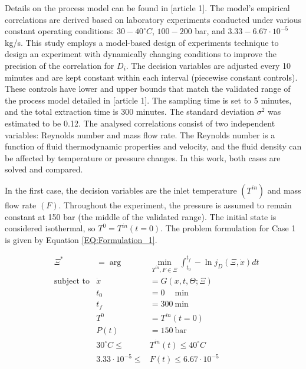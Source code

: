 \documentclass[../Article_Design_of_Experiment.tex]{subfiles}
\begin{document}
	Details on the process model can be found in [article 1]. The model's empirical correlations are derived based on laboratory experiments conducted under various constant operating conditions: $30 - 40^\circ C$, $100 - 200$ bar, and $3.33-6.67 \cdot 10^{-5}$ kg/s. This study employs a model-based design of experiments technique to design an experiment with dynamically changing conditions to improve the precision of the correlation for $D_i$. The decision variables are adjusted every 10 minutes and are kept constant within each interval (piecewise constant controls). These controls have lower and upper bounds that match the validated range of the process model detailed in [article 1]. The sampling time is set to 5 minutes, and the total extraction time is 300 minutes. The standard deviation $\sigma^2$ was estimated to be 0.12. The analysed correlations consist of two independent variables: Reynolds number and mass flow rate. The Reynolds number is a function of fluid thermodynamic properties and velocity, and the fluid density can be affected by temperature or pressure changes. In this work, both cases are solved and compared.
	
	In the first case, the decision variables are the inlet temperature $(T^{in})$ and mass flow rate $(F)$. Throughout the experiment, the pressure is assumed to remain constant at 150 bar (the middle of the validated range). The initial state is considered isothermal, so $T^0 = T^{in}(t=0)$. The problem formulation for Case 1 is given by Equation \ref{EQ:Formulation_1}.
	
	{\footnotesize
	\begin{equation}
		\begin{aligned} 
			&\Xi^* &= \arg &\min_{ T^{in}, F \in \Xi} \int_{t_0}^{t_f} - \ln j_D(\Xi,\dot{x}) dt  \\
			&\text{subject to}
			& \dot{x} &= G(x,t,\Theta;\Xi) \\
			&& t_0&=0\quad~\text{min} \\
			&& t_f&=300~\text{min} \\
			&& T^{0} &= T^{in}(t=0) \\
			&& P(t) &= 150~\text{bar} \\
			&& 30^\circ C \leq &T^{in}(t) \leq 40^\circ C \\
			&& 3.33 \cdot 10^{-5} \leq &F(t) \leq 6.67 \cdot 10^{-5}
		\end{aligned} \label{EQ:Formulation_1}
	\end{equation} } 
	
\end{document}
